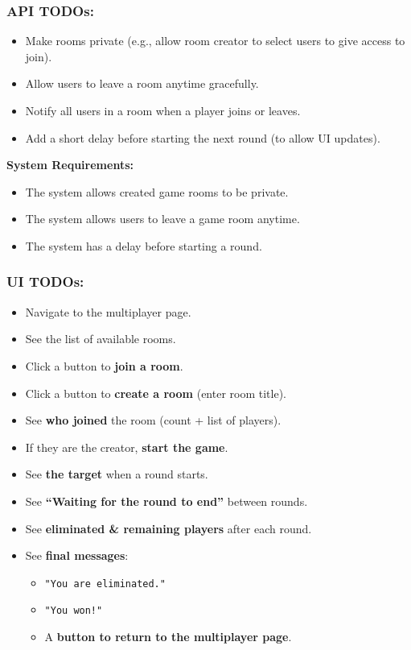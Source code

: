 \documentclass[]{VUMIFTemplateClass}
\begin{document}
\subsubsection{API TODOs:}
\begin{itemize}
    \item Make rooms private (e.g., allow room creator to select users to give access to join).
    \item Allow users to leave a room anytime gracefully.
    \item Notify all users in a room when a player joins or leaves.
    \item Add a short delay before starting the next round (to allow UI updates).
\end{itemize}

\textbf{System Requirements:}
\begin{itemize}
    \item The system allows created game rooms to be private.
    \item The system allows users to leave a game room anytime.
    \item The system has a delay before starting a round.
\end{itemize}

\subsubsection{UI TODOs:}
\begin{itemize}
    \item Navigate to the multiplayer page.
    \item See the list of available rooms.
    \item Click a button to \textbf{join a room}.
    \item Click a button to \textbf{create a room} (enter room title).
    \item See \textbf{who joined} the room (count + list of players).
    \item If they are the creator, \textbf{start the game}.
    \item See \textbf{the target} when a round starts.
    \item See \textbf{“Waiting for the round to end”} between rounds.
    \item See \textbf{eliminated \& remaining players} after each round.
    \item See \textbf{final messages}:
    \begin{itemize}
        \item \texttt{"You are eliminated."}
        \item \texttt{"You won!"}
        \item A \textbf{button to return to the multiplayer page}.
    \end{itemize}
\end{itemize}
\end{document}
